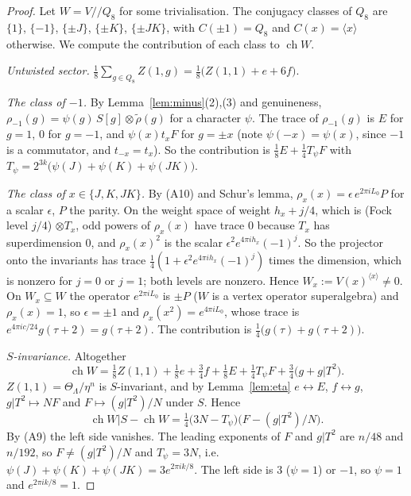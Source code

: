 \documentclass[11pt]{amsart}
\theoremstyle{definition}
\newcommand{\ch}{\operatorname{ch}}
\newcommand{\orb}{/\!\!/}
\begin{document}
\begin{proof}
Let $W=V\orb Q_8$ for some trivialisation. The conjugacy classes of $Q_8$ are $\{1\}$, $\{-1\}$,
$\{\pm J\}$, $\{\pm K\}$, $\{\pm JK\}$, with $C(\pm1)=Q_8$ and $C(x)=\langle x\rangle$ otherwise. We
compute the contribution of each class to $\ch W$.

\emph{Untwisted sector.} $\frac18\sum_{g\in Q_8}Z(1,g)=\frac18\bigl(Z(1,1)+e+6f\bigr)$.

\emph{The class of $-1$.} By Lemma~\ref{lem:minus}(2),(3) and genuineness,
$\rho_{-1}(g)=\psi(g)\,S[g]\otimes\tilde\rho(g)$ for a character $\psi$. The trace of $\rho_{-1}(g)$ is
$E$ for $g=1$, $0$ for $g=-1$, and $\psi(x)t_xF$ for $g=\pm x$ (note $\psi(-x)=\psi(x)$, since $-1$ is a
commutator, and $t_{-x}=t_x$). So the contribution is $\frac18E+\frac14T_\psi F$ with
$T_\psi=2^{3k}\bigl(\psi(J)+\psi(K)+\psi(JK)\bigr)$.

\emph{The class of $x\in\{J,K,JK\}$.} By (A10) and Schur's lemma, $\rho_x(x)=\epsilon\,e^{2\pi iL_0}P$ for a
scalar $\epsilon$, $P$ the parity. On the weight space of weight $h_x+j/4$, which is (Fock level $j/4$)
$\otimes T_x$, odd powers of $\rho_x(x)$ have trace $0$ because $T_x$ has superdimension $0$, and
$\rho_x(x)^2$ is the scalar $\epsilon^2e^{4\pi ih_x}(-1)^j$. So the projector onto the invariants has
trace $\frac14(1+\epsilon^2e^{4\pi ih_x}(-1)^j)$ times the dimension, which is nonzero for $j=0$ or $j=1$;
both levels are nonzero. Hence $W_x:=V(x)^{\langle x\rangle}\ne0$. On $W_x\subseteq W$ the operator
$e^{2\pi iL_0}$ is $\pm P$ ($W$ is a vertex operator superalgebra) and $\rho_x(x)=1$, so $\epsilon=\pm1$
and $\rho_x(x^2)=e^{4\pi iL_0}$, whose trace is $e^{4\pi ic/24}g(\tau+2)=g(\tau+2)$. The contribution is
$\frac14\bigl(g(\tau)+g(\tau+2)\bigr)$.

\emph{$S$-invariance.} Altogether
\[
  \ch W=\tfrac18Z(1,1)+\tfrac18e+\tfrac34f+\tfrac18E+\tfrac14T_\psi F+\tfrac34\bigl(g+g|T^2\bigr).
\]
$Z(1,1)=\Theta_\Lambda/\eta^n$ is $S$-invariant, and by Lemma~\ref{lem:eta} $e\leftrightarrow E$,
$f\leftrightarrow g$, $g|T^2\mapsto NF$ and $F\mapsto(g|T^2)/N$ under $S$. Hence
\[
  \ch W|S-\ch W=\tfrac14\bigl(3N-T_\psi\bigr)\bigl(F-(g|T^2)/N\bigr).
\]
By (A9) the left side vanishes. The leading exponents of $F$ and $g|T^2$ are $n/48$ and $n/192$, so
$F\ne(g|T^2)/N$ and $T_\psi=3N$, i.e.\ $\psi(J)+\psi(K)+\psi(JK)=3e^{2\pi ik/8}$. The left side is $3$
($\psi=1$) or $-1$, so $\psi=1$ and $e^{2\pi ik/8}=1$.
\end{proof}
\end{document}
